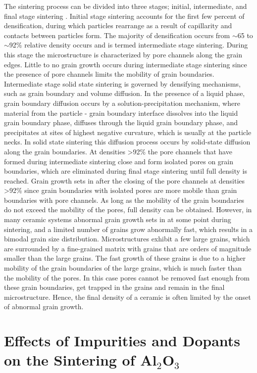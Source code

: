 The sintering process can be divided into three stages; initial, intermediate, and final stage sintering \cite{Kang2004}. Initial stage sintering accounts for the first few percent of densification, during which particles rearrange as a result of capillarity and contacts between particles form. The majority of densification occurs from $\sim$65 to $\sim$92\% relative density occurs and is termed intermediate stage sintering. During this stage the microstructure is characterized by pore channels along the grain edges. Little to no grain growth occurs during intermediate stage sintering since the presence of pore channels limits the mobility of grain boundaries. Intermediate stage solid state sintering is governed by densifying mechanisms, such as grain boundary and volume diffusion. In the presence of a liquid phase, grain boundary diffusion occurs by a solution-precipitation mechanism, where material from the particle - grain boundary interface dissolves into the liquid grain boundary phase, diffuses through the liquid grain boundary phase, and precipitates at sites of highest negative curvature, which is usually at the particle necks. In solid state sintering this diffusion process occurs by solid-state diffusion along the grain boundaries. At densities >92\% the pore channels that have formed during intermediate sintering close and form isolated pores on grain boundaries, which are eliminated during final stage sintering until full density is reached. Grain growth sets in after the closing of the pore channels at densities >92\% since grain boundaries with isolated pores are more mobile than grain boundaries with pore channels. As long as the mobility of the grain boundaries do not exceed the mobility of the pores, full density can be obtained. However, in many ceramic systems abnormal grain growth sets in at some point during sintering, and a limited number of grains grow abnormally fast, which results in a bimodal grain size distribution. Microstructures exhibit a few large grains, which are surrounded by a fine-grained matrix with grains that are orders of magnitude smaller than the large grains. The fast growth of these grains is due to a higher mobility of the grain boundaries of the large grains, which is much faster than the mobility of the pores. In this case pores cannot be removed fast enough from these grain boundaries, get trapped in the grains and remain in the final microstructure. Hence, the final density of a ceramic is often limited by the onset of abnormal grain growth. 

\section{Effects of Impurities and Dopants on the Sintering of Al$_{2}$O$_{3}$}

